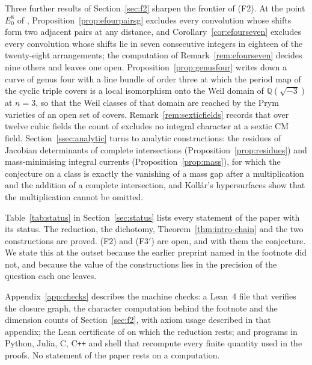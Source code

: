 \documentclass[11pt,reqno]{amsart}
\makeatletter
\renewcommand\subsection{\@startsection{subsection}{2}\z@{.6\linespacing\@plus.7\linespacing}{.3\linespacing}{\normalfont\bfseries}}
\numberwithin{equation}{section}
\theoremstyle{plain}
\theoremstyle{definition}
\newcommand{\QQ}{\mathbb{Q}}
\newcommand{\Fii}{\texorpdfstring{\textup{(F2)}}{(F2)}}
\newcommand{\Fiii}{\texorpdfstring{\textup{(F3$'$)}}{(F3')}}
\makeatother
\begin{document}
Three further results of Section~\ref{sec:f2} sharpen the frontier of \Fii{}. At the point $E_{0}^{8}$ of \cite[\S18]{BMB26}, Proposition~\ref{prop:efourpairsg} excludes every convolution whose shifts form two adjacent pairs at any distance, and Corollary~\ref{cor:efourseven} excludes every convolution whose shifts lie in seven consecutive integers in eighteen of the twenty-eight arrangements; the computation of Remark~\ref{rem:efourseven} decides nine others and leaves one open. Proposition~\ref{prop:genusfour} writes down a curve of genus four with a line bundle of order three at which the period map of the cyclic triple covers is a local isomorphism onto the Weil domain of $\QQ(\sqrt{-3})$ at $n=3$, so that the Weil classes of that domain are reached by the Prym varieties of an open set of covers. Remark~\ref{rem:sexticfields} records that over twelve cubic fields the count of \cite[Prop.~19.47]{BMB26} excludes no integral character at a sextic CM field. Section~\ref{ssec:analytic} turns to analytic constructions: the residues of Jacobian determinants of complete intersections (Proposition~\ref{prop:residues}) and mass-minimising integral currents (Proposition~\ref{prop:mass}), for which the conjecture on a class is exactly the vanishing of a mass gap after a multiplication and the addition of a complete intersection, and Koll\'ar's hypersurfaces show that the multiplication cannot be omitted.

\subsection{What is proved and what is not}

Table~\ref{tab:status} in Section~\ref{sec:status} lists every statement of the paper with its status. The reduction, the dichotomy, Theorem~\ref{thm:intro-chain} and the two constructions are proved. \Fii{} and \Fiii{} are open, and with them the conjecture. We state this at the outset because the earlier preprint named in the footnote did not, and because the value of the constructions lies in the precision of the question each one leaves.

Appendix~\ref{app:checks} describes the machine checks: a Lean~4 file that verifies the closure graph, the character computation behind the footnote and the dimension counts of Section~\ref{sec:f2}, with axiom usage described in that appendix; the Lean certificate of \cite{BMB26} on which the reduction rests; and programs in Python, Julia, C, C\texttt{++} and shell that recompute every finite quantity used in the proofs. No statement of the paper rests on a computation.
\end{document}
